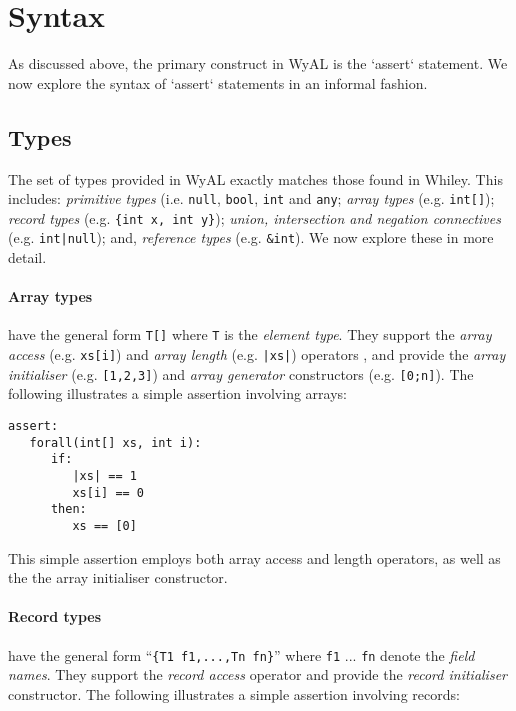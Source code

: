 \section{Syntax}
As discussed above, the primary construct in WyAL is the `assert`
statement.  We now explore the syntax of `assert` statements in an
informal fashion.


\subsection{Types}

The set of types provided in WyAL exactly matches those found in
Whiley.  This includes: {\em primitive types} (i.e. \lstinline{null},
\lstinline{bool}, \lstinline{int} and \lstinline{any}; {\em array
    types} (e.g. \lstinline{int[]}); {\em record types}
  (e.g. \lstinline|{int x, int y}|); {\em union, intersection and
    negation connectives} (e.g. \lstinline{int|null}); and,
  {\em reference types} (e.g. \lstinline{&int}).  We now explore these
  in more detail.

\paragraph{Array types} have the general form
  \lstinline{T[]} where \lstinline{T} is the {\em element type}.  They
  support the {\em array access} (e.g. \lstinline{xs[i]}) and {\em
    array length} (e.g. \lstinline{|xs|}) operators , and provide the
  {\em array initialiser} (e.g. \lstinline{[1,2,3]}) and {\em array
    generator} constructors (e.g. \lstinline{[0;n]}).  The following
  illustrates a simple assertion involving arrays:

\begin{lstlisting}[language=WyAL]
assert:
   forall(int[] xs, int i):
      if:
         |xs| == 1
         xs[i] == 0
      then:
         xs == [0]
\end{lstlisting}

This simple assertion employs both array access and length operators,
as well as the the array initialiser constructor.

\paragraph{Record types} have the general form ``\lstinline|{T1 f1,...,Tn fn}|'' where \lstinline{f1} ... \lstinline{fn} denote the
{\em field names}.  They support the {\em record access} operator and provide the {\em
  record initialiser} constructor.  The following illustrates a simple
assertion involving records:


